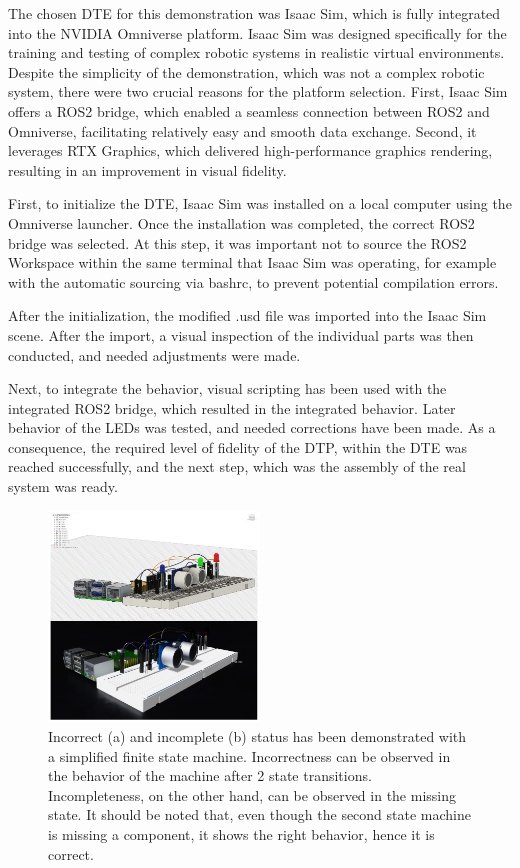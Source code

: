 \documentclass[conference]{IEEEtran}
\begin{document}
    The chosen DTE for this demonstration was Isaac Sim, which is fully integrated into the NVIDIA Omniverse platform. Isaac Sim was designed specifically for the training and testing of complex robotic 
    systems in realistic virtual environments. Despite the simplicity of the demonstration, which was not a complex robotic system, there were two crucial reasons for the platform selection. 
    First, Isaac Sim offers a ROS2 bridge, which enabled a seamless connection between ROS2 and Omniverse, facilitating relatively easy and smooth data exchange. Second, it leverages RTX Graphics, 
    which delivered high-performance graphics rendering, resulting in an improvement in visual fidelity. 

    First, to initialize the DTE, Isaac Sim was installed on a local computer using the Omniverse launcher. Once the installation was completed, the correct ROS2 bridge was selected. 
    At this step, it was important not to source the ROS2 Workspace within the same terminal that Isaac Sim was operating, for example with the automatic sourcing via bashrc, to prevent potential compilation errors. 

    After the initialization, the modified .usd file was imported into the Isaac Sim scene. After the import, a visual inspection of the individual 
    parts was then conducted, and needed adjustments were made. 

    Next, to integrate the behavior, visual scripting has been used with the integrated ROS2 bridge, which resulted in the integrated behavior. 
    Later behavior of the LEDs was tested, and needed corrections have been made. As a consequence, the required level of fidelity of the DTP, within the DTE 
    was reached successfully, and the next step, which was the assembly of the real system was ready.

    
    \begin{figure}[htbp]
        \centering
        \includegraphics[width=0.5\textwidth]{Left.png}
        \caption{Incorrect (a) and incomplete (b) status has been demonstrated with a simplified finite state machine. Incorrectness can be observed in the behavior 
        of the machine after 2 state transitions. Incompleteness, on the other hand, can be observed in the missing state. It should be noted that, even though the second state machine is missing a 
        component, it shows the right behavior, hence it is correct.}\label{fig:Left}
    \end{figure}
\end{document}
